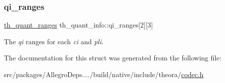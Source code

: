 \subsubsection{\texorpdfstring{qi\+\_\+ranges}{qi\_ranges}}
{\footnotesize\ttfamily \hyperlink{structth__quant__ranges}{th\+\_\+quant\+\_\+ranges} th\+\_\+quant\+\_\+info\+::qi\+\_\+ranges\mbox{[}2\mbox{]}\mbox{[}3\mbox{]}}

The {\itshape qi} ranges for each {\itshape ci} and {\itshape pli}. 

The documentation for this struct was generated from the following file\+:\begin{DoxyCompactItemize}
\item 
src/packages/\+Allegro\+Deps..../build/native/include/theora/\hyperlink{theora_2codec_8h}{codec.\+h}\end{DoxyCompactItemize}
